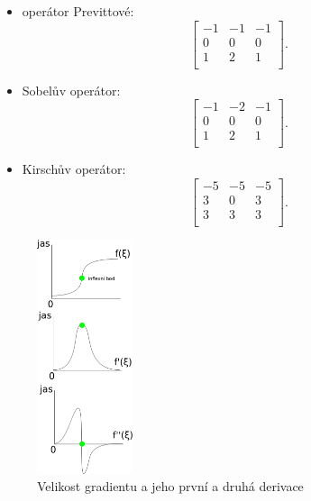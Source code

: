 \begin{itemize}
\begin{equation*}
\end{equation*}
	\item operátor Previttové:
	\begin{equation*}
	 \begin{bmatrix}
     -1 & -1  & -1      \\[0.3em]
      0 &  0  &  0      \\[0.3em]
      1 &  2  &  1      \\
     \end{bmatrix}.
\end{equation*}
	\item Sobelův operátor:
	\begin{equation*}
	 \begin{bmatrix}
     -1 & -2  & -1      \\[0.3em]
      0 &  0  &  0      \\[0.3em]
      1 &  2  &  1      \\
     \end{bmatrix}.
\end{equation*}
	\item Kirschův operátor:
		\begin{equation*}
	 \begin{bmatrix}
     -5 & -5  & -5      \\[0.3em]
      3 &  0  &  3      \\[0.3em]
      3 &  3  &  3      \\
     \end{bmatrix}.
\end{equation*}
\end{itemize}
 		\begin{figure}[H]
 	\begin{center}
	\includegraphics[width=0.25\textwidth]{assets/8_det_hran_grad}
	\caption{Velikost gradientu a jeho první a druhá derivace}
	\end{center}
	\end{figure}

